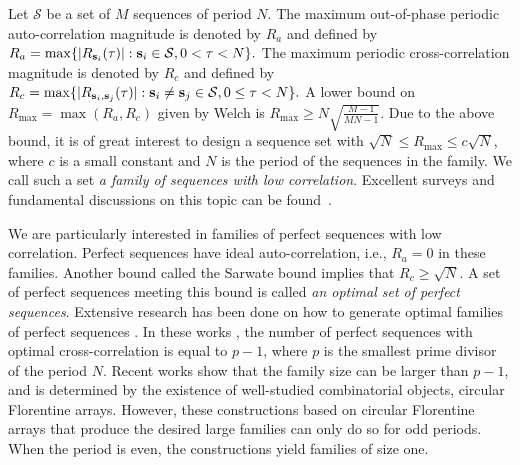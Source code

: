 \documentclass[conference,letterpaper]{IEEEtran}
\theoremstyle{definition}
\begin{document}
 
Let  $\mathcal{S}$ be a set  of $M$ sequences of period $N$.  The maximum out-of-phase periodic auto-correlation magnitude is denoted by $R_{a}$ and defined by
$
R_{a} =  \max\{ \vert R_{{\bf s}_{i}}(\tau) \vert : {\bf s}_{i} \in \mathcal{S}, 0 < \tau < N \}.
$
The  maximum periodic cross-correlation magnitude is denoted by $R_{c}$ and defined by
$
R_{c} =  \max\{ \vert R_{{\bf s}_{i}, {\bf s}_{j}}(\tau) \vert : {\bf s}_{i} \neq {\bf s}_{j} \in \mathcal{S},  0 \leq \tau < N \}.
$  A lower bound on $R_{\max}= \max (R_{a}, R_{c})$  given by Welch \cite{Welch} is
$
R_{\max}\geq N\sqrt{\frac{M-1}{MN-1}}. 
$
Due to the above bound, it is of great interest to design  a sequence set with $ \sqrt{N}\leq R_{\max}\leq c\sqrt{N}$, where $c $ is a small constant and $N$ is the period of the sequences in the family. We call such a set \textit{a family of sequences with low correlation}.  Excellent surveys and fundamental discussions on this topic can be found~\cite{ HellesethKumar, Garg2009}.
 
We are particularly interested in families of perfect sequences with low correlation. Perfect sequences have ideal auto-correlation, i.e., $R_{a} =0$ in these families. Another bound called the Sarwate bound \cite{Sarwate} implies that $R_{c} \geq \sqrt{N}$. A set of perfect sequences meeting this bound is called \textit{an optimal set of perfect sequences}. Extensive research has been done on how to generate optimal families of perfect sequences \cite{Sarwate, Alltop, Alltop1, Popovic2, Suehiro, chirplike, Gabidulin1993, MSong, Mow, KPark, DanISIT2020,DanTIT22,SSong22}. In these works \cite{Sarwate, Alltop, Alltop1, Popovic2, Suehiro, chirplike, Gabidulin1993, MSong, Mow, KPark}, the number of perfect sequences with optimal cross-correlation is equal to $p-1$, where $p$ is the smallest prime divisor of  the period $N$.  Recent works \cite{DanISIT2020,DanTIT22,SSong22} show that the family size can be larger than $p-1$, and is determined by the existence of well-studied combinatorial objects, circular Florentine arrays. However, these constructions based on circular Florentine arrays that produce the desired large families can only do so for odd periods. When the period is even, the constructions yield families of size one.

\end{document}
